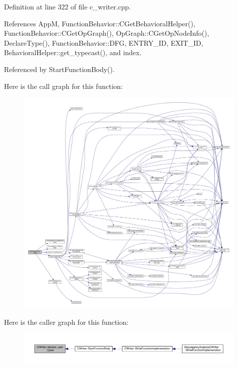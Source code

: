 Definition at line 322 of file c\+\_\+writer.\+cpp.



References AppM, Function\+Behavior\+::\+C\+Get\+Behavioral\+Helper(), Function\+Behavior\+::\+C\+Get\+Op\+Graph(), Op\+Graph\+::\+C\+Get\+Op\+Node\+Info(), Declare\+Type(), Function\+Behavior\+::\+D\+FG, E\+N\+T\+R\+Y\+\_\+\+ID, E\+X\+I\+T\+\_\+\+ID, Behavioral\+Helper\+::get\+\_\+typecast(), and index.



Referenced by Start\+Function\+Body().

Here is the call graph for this function\+:
\nopagebreak
\begin{figure}[H]
\begin{center}
\leavevmode
\includegraphics[width=350pt]{d3/d59/classCWriter_abe7dc69f7739cf009bd2e943a60d1920_cgraph}
\end{center}
\end{figure}
Here is the caller graph for this function\+:
\nopagebreak
\begin{figure}[H]
\begin{center}
\leavevmode
\includegraphics[width=350pt]{d3/d59/classCWriter_abe7dc69f7739cf009bd2e943a60d1920_icgraph}
\end{center}
\end{figure}
\mbox{\label{classCWriter_a0a14899d7e4f403c1ee6e612566cd9f4}} 
